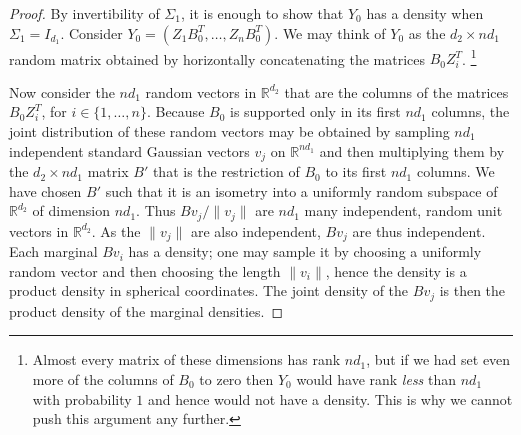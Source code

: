 \documentclass[aos]{imsart}
\theoremstyle{definition}
\numberwithin{equation}{section}
\newcommand{\R}{{\mathbb{R}}}
\begin{document}
\begin{proof}
By invertibility of $\Sigma_1$, it is enough to show that $Y_0$ has a density when $\Sigma_1 = I_{d_1}$.
Consider $Y_0 = (Z_1 B_0^T, \dots, Z_n B_0^T)$.
We may think of $Y_0$ as the $d_2 \times n d_1$ random matrix obtained by horizontally concatenating the matrices $B_0Z_i^T$.
\footnote{
Almost every matrix of these dimensions has rank $n d_1$, but if we had set even more of the columns of $B_0$ to zero then $Y_0$ would have rank \emph{less} than $n d_1$ with probability $1$ and hence would not have a density.
This is why we cannot push this argument any further.}

Now consider the $nd_1$ random vectors in $ \R^{d_2}$ that are the columns of the matrices $B_0 Z_i^T$, for $i \in \{1, \dots, n\}$.
Because $B_0$ is supported only in its first $nd_1$ columns, the joint distribution of these random vectors may be obtained by sampling $n d_1$ independent standard Gaussian vectors $v_j$ on $\R^{nd_1}$ and then multiplying them by the $d_2 \times nd_1$ matrix $B'$ that is the restriction of $B_0$ to its first $nd_1$ columns.
We have chosen $B'$ such that it is an isometry into a uniformly random subspace of $\R^{d_2}$ of dimension $nd_1$.
Thus $Bv_j/\|v_j\|$ are $nd_1$ many independent, random unit vectors in $\R^{d_2}$.
As the $\|v_j\|$ are also independent, $B v_j$ are thus independent. Each marginal $Bv_i$ has a density; one may sample it by choosing a uniformly random vector and then choosing the length $\|v_i\|$, hence the density is a product density in spherical coordinates. The joint density of the $Bv_j$ is then the product density of the marginal densities.
\end{proof}
\end{document}
